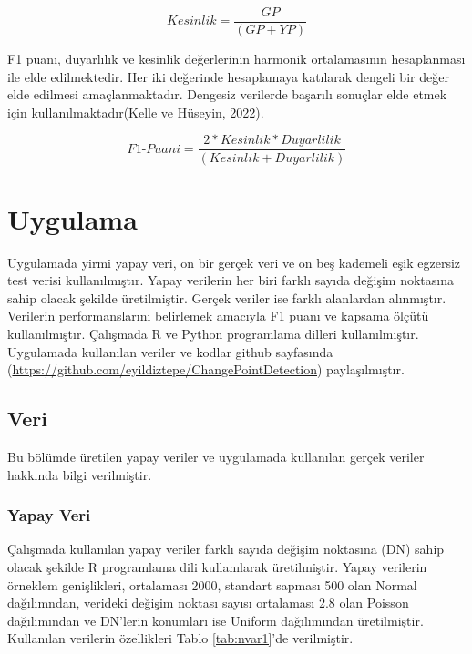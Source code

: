 \documentclass[12pt,twoside]{deuthesis}
\begin{document}
\[Kesinlik =  \frac{GP}{(GP + YP)}\]

F1 puanı, duyarlılık ve kesinlik değerlerinin harmonik ortalamasının hesaplanması ile elde edilmektedir. Her iki değerinde hesaplamaya katılarak dengeli bir değer elde edilmesi amaçlanmaktadır. Dengesiz verilerde başarılı sonuçlar elde etmek için kullanılmaktadır(Kelle ve Hüseyin, 2022).

\[ F1\text{-}Puani = \frac{2 * Kesinlik * Duyarlilik}{(Kesinlik + Duyarlilik)} \]

\chapter{Uygulama}\label{Bolum3}

Uygulamada yirmi yapay veri, on bir gerçek veri ve on beş kademeli eşik egzersiz test verisi kullanılmıştır. Yapay verilerin her biri farklı sayıda değişim noktasına sahip olacak şekilde üretilmiştir. Gerçek veriler ise farklı alanlardan alınmıştır. Verilerin performanslarını belirlemek amacıyla F1 puanı ve kapsama ölçütü kullanılmıştır. Çalışmada R ve Python programlama dilleri kullanılmıştır. Uygulamada kullanılan veriler ve kodlar github sayfasında (\url{https://github.com/eyildiztepe/ChangePointDetection}) paylaşılmıştır.

\section{Veri}\label{veri}

Bu bölümde üretilen yapay veriler ve uygulamada kullanılan gerçek veriler hakkında bilgi verilmiştir.

\subsection{Yapay Veri}\label{yapay-veri}

Çalışmada kullanılan yapay veriler farklı sayıda değişim noktasına (DN) sahip olacak şekilde R programlama dili kullanılarak üretilmiştir. Yapay verilerin örneklem genişlikleri, ortalaması 2000, standart sapması 500 olan Normal dağılımndan, verideki değişim noktası sayısı ortalaması 2.8 olan Poisson dağılımından ve DN'lerin konumları ise Uniform dağılımından üretilmiştir. Kullanılan verilerin özellikleri Tablo \ref{tab:nvar1}'de verilmiştir.
\end{document}
